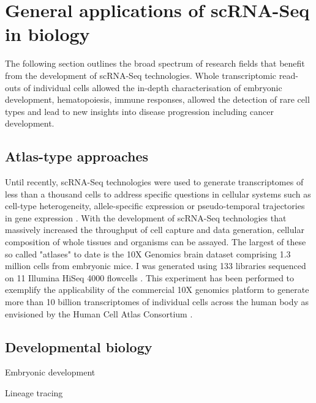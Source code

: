 
\section{General applications of scRNA-Seq in biology}

The following section outlines the broad spectrum of research fields that benefit from the development of scRNA-Seq technologies. Whole transcriptomic read-outs of individual cells allowed the in-depth characterisation of embryonic development, hematopoiesis, immune responses, allowed the detection of rare cell types and lead to new insights into disease progression including cancer development. 

\subsection{Atlas-type approaches}

Until recently, scRNA-Seq technologies were used to generate transcriptomes of less than a thousand cells to address specific questions in cellular systems such as cell-type heterogeneity, allele-specific expression or pseudo-temporal trajectories in gene expression \citep{Kolodziejczyk2015review}. With the development of scRNA-Seq technologies that massively increased the throughput of cell capture and data generation, cellular composition of whole tissues and organisms can be assayed. The largest of these so called "atlases" to date is the 10X Genomics\textsuperscript{\textregistered}{} brain dataset comprising 1.3 million cells from embryonic mice. I was generated using 133 libraries sequenced on 11 Illumina HiSeq\textsuperscript{\textregistered}{} 4000 flowcells \citep{Note2017}. This experiment has been performed to exemplify the applicability of the commercial 10X genomics platform to generate more than 10 billion transcriptomes of individual cells across the human body as envisioned by the Human Cell Atlas Consortium \citep{Regev2017}.\\



\subsection{Developmental biology}

Embryonic development

Lineage tracing

